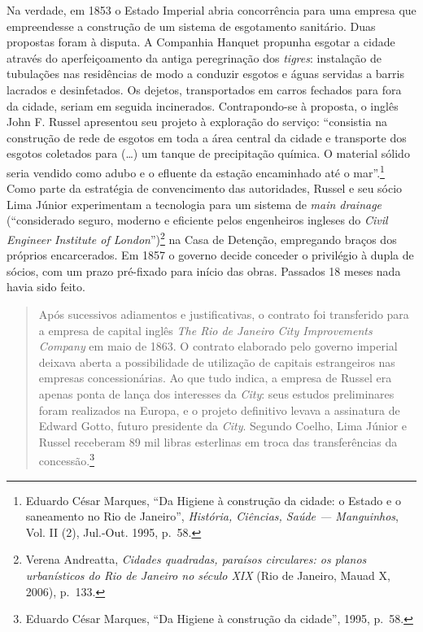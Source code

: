 Na verdade, em 1853 o Estado Imperial abria concorrência para uma
empresa que empreendesse a construção de um sistema de esgotamento
sanitário. Duas propostas foram à disputa. A Companhia Hanquet propunha
esgotar a cidade através do aperfeiçoamento da antiga peregrinação dos
\textit{tigres}: instalação de tubulações nas residências de modo a
conduzir esgotos e águas servidas a barris lacrados e desinfetados. Os
dejetos, transportados em carros fechados para fora da cidade, seriam em
seguida incinerados. Contrapondo-se à proposta, o inglês John F. Russel
apresentou seu projeto à exploração do serviço: ``consistia na
construção de rede de esgotos em toda a área central da cidade e
transporte dos esgotos coletados para (\ldots{}) um tanque de
precipitação química. O material sólido seria vendido como adubo e o
efluente da estação encaminhado até o mar''.\footnote{Eduardo César
  Marques, ``Da Higiene à construção da cidade: o Estado e o saneamento
  no Rio de Janeiro'', \textit{História, Ciências, Saúde --- Manguinhos},
  Vol. II (2), Jul.-Out. 1995, p.~58.} Como parte da estratégia de
convencimento das autoridades, Russel e seu sócio Lima Júnior
experimentam a tecnologia para um sistema de \textit{main drainage}
(``considerado seguro, moderno e eficiente pelos engenheiros ingleses do
\textit{Civil Engineer Institute of London}'')\footnote{Verena Andreatta,
  \textit{Cidades quadradas, paraísos circulares: os planos urbanísticos
  do Rio de Janeiro no século XIX} (Rio de Janeiro, Mauad X, 2006),
  p.~133.} na Casa de Detenção, empregando braços dos próprios
encarcerados. Em 1857 o governo decide conceder o privilégio à dupla de
sócios, com um prazo pré-fixado para início das obras. Passados 18 meses
nada havia sido feito.

\begin{quote}
Após sucessivos adiamentos e justificativas, o contrato foi transferido
para a empresa de capital inglês \textit{The Rio de Janeiro City
Improvements Company} em maio de 1863. O contrato elaborado pelo governo
imperial deixava aberta a possibilidade de utilização de capitais
estrangeiros nas empresas concessionárias. Ao que tudo indica, a empresa
de Russel era apenas ponta de lança dos interesses da \textit{City}: seus
estudos preliminares foram realizados na Europa, e o projeto definitivo
levava a assinatura de Edward Gotto, futuro presidente da \textit{City}.
Segundo Coelho, Lima Júnior e Russel receberam 89 mil libras esterlinas
em troca das transferências da concessão.\footnote{Eduardo César
  Marques, ``Da Higiene à construção da cidade'', 1995, p.~58.}
\end{quote}

